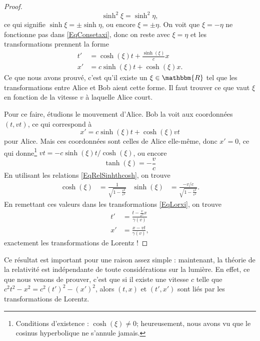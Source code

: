 \documentclass[a4paper,12pt]{book}
\newcommand{\eR}{\mathbbm{R}}
\theoremstyle{mes_exemples}	\newtheorem{exemple}[numtho]{Exemple}
\theoremstyle{mes_tho}
\begin{document}
\begin{proof}
	\[ 
	  \sinh^2\xi=\sinh^2\eta,
	\]
	ce qui signifie $\sinh\xi=\pm\sinh\eta$, ou encore $\xi=\pm\eta$. On voit que $\xi=-\eta$ ne fonctionne pas dans \eqref{EqConsetaxi}, donc on reste avec $\xi=\eta$ et les transformations prennent la forme
	\begin{equation}	\label{EqLorxi}
		\begin{split}
			t'&=\cosh(\xi) t+\frac{ \sinh(\xi) }{ c }x\\
			x'&=c\sinh(\xi) t+\cosh(\xi)x.
		\end{split}
	\end{equation}
	Ce que nous avons prouvé, c'est qu'il existe un $\xi\in\eR$ tel que les transformations entre Alice et Bob aient cette forme. Il faut trouver ce que vaut $\xi$ en fonction de la vitesse $v$ à laquelle Alice court.

	Pour ce faire, étudions le mouvement d'Alice. Bob la voit aux coordonnées $(t,vt)$, ce qui correspond à
	\[ 
	  x'=c\sinh(\xi)t+\cosh(\xi)vt
	\]
	pour Alice. Mais ces coordonnées sont celles de Alice elle-même, donc $x'=0$, ce qui donne\footnote{Conditions d'existence : $\cosh(\xi)\neq 0$; heureusement, nous avons vu que le cosinus hyperbolique ne s'annule jamais.} $vt=- c\sinh(\xi)t/ \cosh(\xi)$, ou encore
	\begin{equation}
		\tanh(\xi)=-\frac{ v }{ c }
	\end{equation}
	En utilisant les relations \eqref{EqRelSinhthcosh}, on trouve
	\begin{align}
		\cosh(\xi)&=\frac{1}{ \sqrt{1-\frac{ v^2 }{ c^2 }} }&\sinh(\xi)&=\frac{ -v/c }{ \sqrt{1-\frac{ v^2 }{ c^2 }} }.
	\end{align}
	En remettant ces valeurs dans les transformations \eqref{EqLorxi}, on trouve
	\begin{align}
		t'&=\frac{ t-\frac{ v }{ c^2 }x }{ \gamma(v) }\\
		x'&=\frac{ x-vt }{ \gamma(v) },
	\end{align}
	exactement les transformations de Lorentz !

\end{proof}


Ce résultat est important pour une raison assez simple : maintenant, la théorie de la relativité est indépendante de toute considérations sur la lumière. En effet, ce que nous venons de prouver, c'est que si il existe une vitesse $c$ telle que $c^2t^2-x^2=c^2(t')^2-(x')^2$, alors $(t,x)$ et $(t',x')$ sont liés par les transformations de Lorentz.

\end{document}
